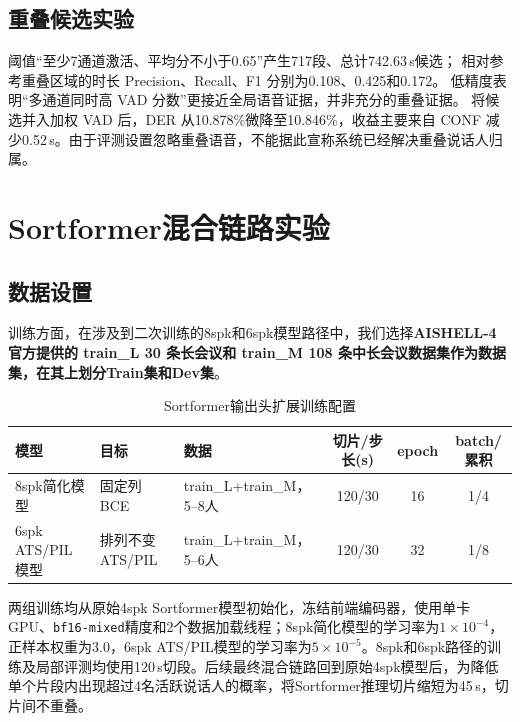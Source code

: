 \documentclass[UTF8,a4paper,10pt]{ctexart}
\begin{document}
\subsection{重叠候选实验}

阈值“至少7通道激活、平均分不小于0.65”产生717段、总计742.63\,s候选；
相对参考重叠区域的时长 Precision、Recall、F1 分别为0.108、0.425和0.172。
低精度表明“多通道同时高 VAD 分数”更接近全局语音证据，并非充分的重叠证据。
将候选并入加权 VAD 后，DER 从10.878\%微降至10.846\%，收益主要来自 CONF
减少0.52\,s。由于评测设置忽略重叠语音，不能据此宣称系统已经解决重叠说话人归属。

\section{Sortformer混合链路实验}


\subsection{数据设置}

训练方面，在涉及到二次训练的8spk和6spk模型路径中，我们选择\textbf{AISHELL-4 官方提供的 train\_L 30 条长会议和 train\_M 108 条中长会议数据集作为数据集，在其上划分Train集和Dev集}。

\begin{table}[H]
\centering
\small
\caption{Sortformer输出头扩展训练配置}
\label{tab:sortformer-train-config}
\begin{tabular}{@{}lp{2.4cm}p{3.1cm}ccc@{}}
\toprule
模型 & 目标 & 数据 & 切片/步长(s) & epoch & batch/累积\\
\midrule
8spk简化模型 & 固定列BCE & train\_L+train\_M，5--8人 & 120/30 & 16 & 1/4\\
6spk ATS/PIL模型 & 排列不变ATS/PIL & train\_L+train\_M，5--6人 & 120/30 & 32 & 1/8\\
\bottomrule
\end{tabular}
\end{table}

两组训练均从原始4spk Sortformer模型初始化，冻结前端编码器，使用单卡GPU、\texttt{bf16-mixed}精度和2个数据加载线程；8spk简化模型的学习率为$1\times10^{-4}$，正样本权重为3.0，6spk ATS/PIL模型的学习率为$5\times10^{-5}$。8spk和6spk路径的训练及局部评测均使用120\,s切段。后续最终混合链路回到原始4spk模型后，为降低单个片段内出现超过4名活跃说话人的概率，将Sortformer推理切片缩短为45\,s，切片间不重叠。
\end{document}
